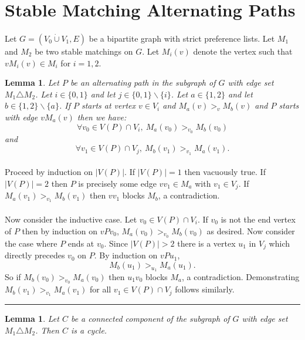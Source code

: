 \documentclass[letterpaper,12pt,oneside,onecolumn]{article}
\newtheorem{lemma}[fact]{Lemma}
\newenvironment{proof}{{\bf Proof:  }}{\hfill\rule{2mm}{2mm}}
\begin{document}
\section{Stable Matching Alternating Paths}
\paragraph{}
Let $G=(V_0 \dot\cup V_1, E)$ be a bipartite graph with strict preference lists. Let $M_1$ and $M_2$ be two stable matchings on $G$. Let $M_i(v)$ denote the vertex such that $vM_i(v) \in M_i$ for $i=1,2$.
\begin{lemma}
Let $P$ be an alternating path in the subgraph of $G$ with edge set $M_1 \triangle M_2$. Let $i \in \{0,1\}$ and let $j \in \{0,1\} \backslash \{i\}$. Let $a \in \{1,2\}$ and let $b \in \{1,2\} \backslash \{a\}$. If $P$ starts at vertex $v \in V_i$ and $M_a(v) >_v M_b(v)$ and $P$ starts with edge $vM_a(v)$ then we have:
$$\forall v_0 \in V(P) \cap V_i,\ M_a(v_0) >_{v_0} M_b(v_0)$$
and
$$\forall v_1 \in V(P) \cap V_j,\ M_b(v_1) >_{v_1} M_a(v_1).$$
\end{lemma}
\begin{proof}
\paragraph{}
Proceed by induction on $|V(P)|$. If $|V(P)| = 1$ then vacuously true. If $|V(P)| = 2$ then $P$ is precisely some edge $vv_1 \in M_a$ with $v_1 \in V_j$. If $M_a(v_1) >_{v_1} M_b(v_1)$ then $vv_1$ blocks $M_b$, a contradiction.
\paragraph{}
Now consider the inductive case. Let $v_0 \in V(P) \cap V_i$. If $v_0$ is not the end vertex of $P$ then by induction on $vPv_0$, $M_a(v_0) >_{v_0} M_b(v_0)$ as desired. Now consider the case where $P$ ends at $v_0$. Since $|V(P)| > 2$ there is a vertex $u_1$ in $V_j$ which directly precedes $v_0$ on $P$. By induction on $vPu_1$,
$$M_b(u_1) >_{u_1} M_a(u_1). $$
So if $M_b(v_0) >_{v_0} M_a(v_0)$ then $u_1v_0$ blocks $M_a$, a contradiction. Demonstrating $M_b(v_1) >_{v_1} M_a(v_1)$ for all $v_1 \in V(P) \cap V_j$ follows similarly. 
\end{proof}
\begin{lemma}
Let $C$ be a connected component of the subgraph of $G$ with edge set $M_1 \triangle M_2$. Then $C$ is a cycle.
\end{lemma}
\end{document}
